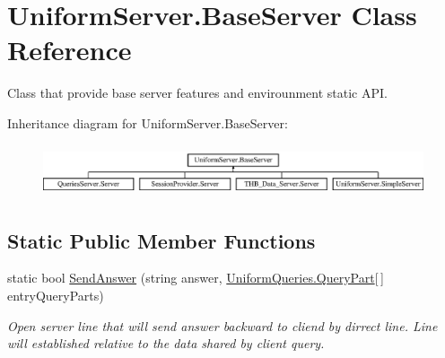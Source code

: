 \hypertarget{class_uniform_server_1_1_base_server}{}\section{Uniform\+Server.\+Base\+Server Class Reference}
\label{class_uniform_server_1_1_base_server}


Class that provide base server features and envirounment static A\+PI.  


Inheritance diagram for Uniform\+Server.\+Base\+Server\+:\begin{figure}[H]
\begin{center}
\leavevmode
\includegraphics[height=1.538461cm]{d7/d32/class_uniform_server_1_1_base_server}
\end{center}
\end{figure}
\subsection*{Static Public Member Functions}
\begin{DoxyCompactItemize}
\item 
static bool \mbox{\hyperlink{class_uniform_server_1_1_base_server_aa85e82df10ecec8324e2ccf7611d8cbf}{Send\+Answer}} (string answer, \mbox{\hyperlink{struct_uniform_queries_1_1_query_part}{Uniform\+Queries.\+Query\+Part}}\mbox{[}$\,$\mbox{]} entry\+Query\+Parts)
\begin{DoxyCompactList}\small\item\em Open server line that will send answer backward to cliend by dirrect line. Line will established relative to the data shared by client query. \end{DoxyCompactList}\end{DoxyCompactItemize}
